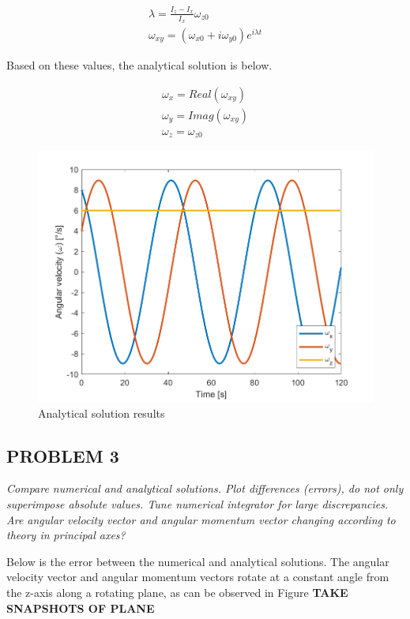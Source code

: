 \begin{align*}
    \lambda = \frac{I_z - I_x}{I_x} \omega_{z0} \\
    \omega_{xy} = (\omega_{x0} + i \omega_{y0}) e^{i \lambda t}
\end{align*}

Based on these values, the analytical solution is below.

\begin{align*}
    \omega_x = Real(\omega_{xy}) \\
    \omega_y = Imag(\omega_{xy}) \\ 
    \omega_z = \omega_{z0}
\end{align*}


\begin{figure}[H]
\centering
\includegraphics[scale=0.6]{Images/ps3_problem2.png}
\caption{Analytical solution results}
\label{fig:ps3_problem2}
\end{figure}


\subsection{PROBLEM 3}
\textit{Compare numerical and analytical solutions. Plot differences (errors), do not only superimpose absolute values. Tune numerical integrator for large discrepancies. Are angular velocity vector and angular momentum vector changing according to theory in principal axes?}

Below is the error between the numerical and analytical solutions. The angular velocity vector and angular momentum vectors rotate at a constant angle from the z-axis along a rotating plane, as can be observed in Figure \textbf{TAKE SNAPSHOTS OF PLANE}

